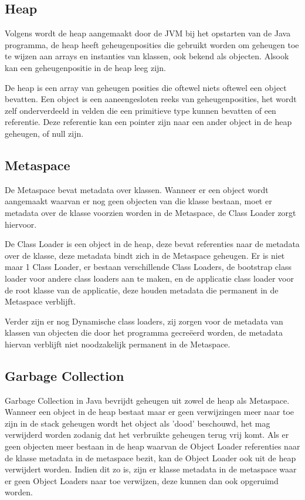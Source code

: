 \subsection{Heap}
\label{sec:heap}
Volgens \textcite{Grgic2018} wordt de heap aangemaakt door de JVM bij het opstarten van de Java programma, de heap heeft geheugenposities die gebruikt worden om geheugen toe te wijzen aan arrays en instanties van klassen, ook bekend als objecten.
Alsook kan een geheugenpositie in de heap leeg zijn.

De heap is een array van geheugen posities die oftewel niets oftewel een object bevatten.
Een object is een aaneengesloten reeks van geheugenposities, het wordt zelf onderverdeeld in velden die een primitieve type kunnen bevatten of een referentie.
Deze referentie kan een pointer zijn naar een ander object in de heap geheugen, of null zijn.\autocite{Bruno2018}
\subsection{Metaspace}
\label{sec:Metaspace}
De Metaspace bevat metadata over klassen.
Wanneer er een object wordt aangemaakt waarvan er nog geen objecten van die klasse bestaan, moet er metadata over de klasse voorzien worden in de Metaspace, de Class Loader zorgt hiervoor.

De Class Loader is een object in de heap, deze bevat referenties naar de metadata over de klasse, deze metadata bindt zich in de Metaspace geheugen.
Er is niet maar 1 Class Loader, er bestaan verschillende Class Loaders, de bootstrap class loader voor andere class loaders aan te maken, en de applicatie class loader voor de root klasse van de applicatie, deze houden metadata die permanent in de Metaspace verblijft.

Verder zijn er nog Dynamische class loaders, zij zorgen voor de metadata van klassen van objecten die door het programma gecreëerd worden, de metadata hiervan verblijft niet noodzakelijk permanent in de Metaspace.
\autocite{Putten2022}
\subsection{Garbage Collection}
\label{sec:garbage collection}
Garbage Collection in Java bevrijdt geheugen uit zowel de heap als Metaspace.
Wanneer een object in de heap bestaat maar er geen verwijzingen meer naar toe zijn in de stack geheugen wordt het object als 'dood' beschouwd, het mag verwijderd worden zodanig dat het verbruikte geheugen terug vrij komt.
Als er geen objecten meer bestaan in de heap waarvan de Object Loader referenties naar de klasse metadata in de metaspace bezit, kan de Object Loader ook uit de heap verwijdert worden.
Indien dit zo is, zijn er klasse metadata in de metaspace waar er geen Object Loaders naar toe verwijzen, deze kunnen dan ook opgeruimd worden. \autocite{Putten2022}


